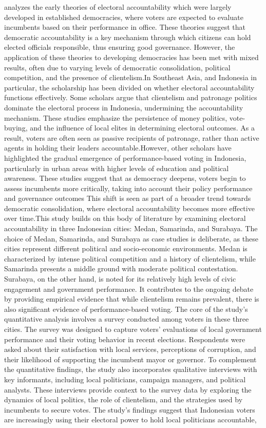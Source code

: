    analyzes the early theories of electoral accountability which were largely developed in established democracies, where voters are expected to evaluate incumbents based on their performance in office. These theories suggest that democratic accountability is a key mechanism through which citizens can hold elected officials responsible, thus ensuring good governance. However, the application of these theories to developing democracies has been met with mixed results, often due to varying levels of democratic consolidation, political competition, and the presence of clientelism.In Southeast Asia, and Indonesia in particular, the scholarship has been divided on whether electoral accountability functions effectively. Some scholars argue that clientelism and patronage politics dominate the electoral process in Indonesia, undermining the accountability mechanism. These studies emphasize the persistence of money politics, vote-buying, and the influence of local elites in determining electoral outcomes. As a result, voters are often seen as passive recipients of patronage, rather than active agents in holding their leaders accountable.However, other scholars have highlighted the gradual emergence of performance-based voting in Indonesia, particularly in urban areas with higher levels of education and political awareness. These studies suggest that as democracy deepens, voters begin to assess incumbents more critically, taking into account their policy performance and governance outcomes This shift is seen as part of a broader trend towards democratic consolidation, where electoral accountability becomes more effective over time.This study builds on this body of literature by examining electoral accountability in three Indonesian cities: Medan, Samarinda, and Surabaya. The choice of Medan, Samarinda, and Surabaya as case studies is deliberate, as these cities represent different political and socio-economic environments. Medan is characterized by intense political competition and a history of clientelism, while Samarinda presents a middle ground with moderate political contestation. Surabaya, on the other hand, is noted for its relatively high levels of civic engagement and government performance. It contributes to the ongoing debate by providing empirical evidence that while clientelism remains prevalent, there is also significant evidence of performance-based voting. The core of the study's quantitative analysis involves a survey conducted among voters in these three cities. The survey was designed to capture voters' evaluations of local government performance and their voting behavior in recent elections. Respondents were asked about their satisfaction with local services, perceptions of corruption, and their likelihood of supporting the incumbent mayor or governor. To complement the quantitative findings, the study also incorporates qualitative interviews with key informants, including local politicians, campaign managers, and political analysts. These interviews provide context to the survey data by exploring the dynamics of local politics, the role of clientelism, and the strategies used by incumbents to secure votes. The study’s findings suggest that Indonesian voters are increasingly using their electoral power to hold local politicians accountable, 